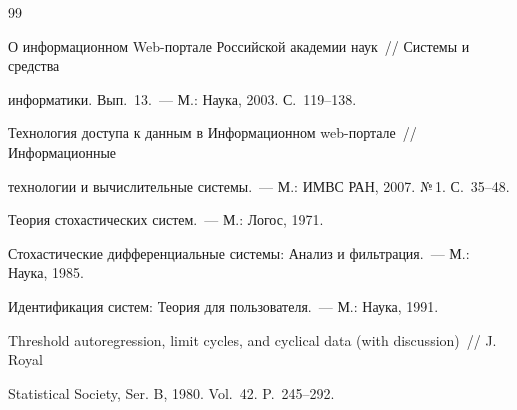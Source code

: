 {\frenchspacing\small




\begin{thebibliography}{99}









О информационном Web-портале Российской академии наук~// Системы и средства 


информатики. Вып.~13.~--- М.: Наука, 2003. С.~119--138.









Технология доступа к данным в Информационном web-портале~// Информационные 


технологии и вычислительные системы.~--- М.: ИМВС РАН, 2007. №\,1. С.~35--48.









Теория стохастических систем.~--- М.: Логос, 1971.









Стохастические дифференциальные системы: Анализ и фильтрация.~--- М.: Наука, 1985.









Идентификация систем: Теория для пользователя.~--- М.: Наука, 1991.









Threshold autoregression, limit cycles, and cyclical data (with discussion)~// J. Royal 


Statistical Society, Ser. B, 1980. Vol.~42. P.~245--292.






\end{thebibliography}}
